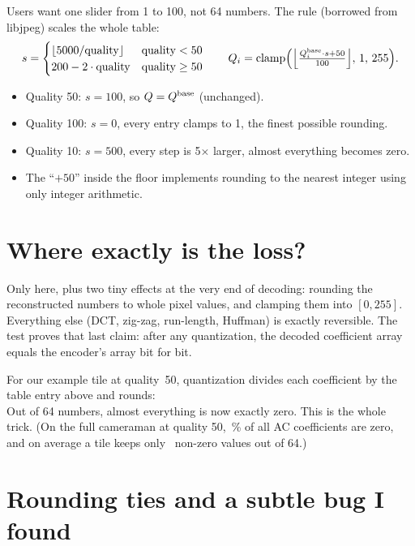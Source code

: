 Users want one slider from 1 to 100, not 64 numbers. The rule (borrowed from libjpeg) scales the whole table:
\begin{equation}
s=\begin{cases}\lfloor 5000/{\rm quality}\rfloor & {\rm quality}<50\\ 200-2\cdot{\rm quality} & {\rm quality}\ge 50\end{cases}
\qquad
Q_i=\operatorname{clamp}\!\Big(\Big\lfloor\tfrac{Q^{\rm base}_i\cdot s+50}{100}\Big\rfloor,\,1,\,255\Big).
\end{equation}
\begin{itemize}
\item Quality 50: $s=100$, so $Q=Q^{\rm base}$ (unchanged).
\item Quality 100: $s=0$, every entry clamps to 1, the finest possible rounding.
\item Quality 10: $s=500$, every step is 5$\times$ larger, almost everything becomes zero.
\item The ``$+50$'' inside the floor implements rounding to the nearest integer using only integer arithmetic.
\end{itemize}


\section{Where exactly is the loss?}

Only here, plus two tiny effects at the very end of decoding: rounding the reconstructed numbers to whole pixel values, and clamping them into $[0,255]$. Everything else (DCT, zig-zag, run-length, Huffman) is exactly reversible. The test  proves that last claim: after any quantization, the decoded coefficient array equals the encoder's array bit for bit.

For our example tile at quality~50, quantization divides each coefficient by the table entry above and rounds:
\[

\]
Out of 64 numbers, almost everything is now exactly zero. This is the whole trick. (On the full cameraman at quality 50, \camZeroShareAC\,\% of all AC coefficients are zero, and on average a tile keeps only \camNonzeroPerBlock\ non-zero values out of 64.)

\section{Rounding ties and a subtle bug I found}

